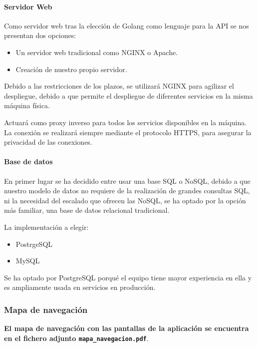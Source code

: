 \documentclass{article}
\begin{document}
\paragraph*{Servidor Web}

Como servidor web tras la elección de Golang como lenguaje para la API se nos presentan dos opciones:

\begin{itemize}
    \item Un servidor web tradicional como NGINX o Apache.
    \item Creación de nuestro propio servidor.
\end{itemize}

Debido a las restricciones de los plazos, se utilizará NGINX para agilizar el despliegue, debido a que permite el despliegue de diferentes servicios en la misma
máquina física.

Actuará como proxy inverso para todos los servicios disponibles en la máquina. La conexión se realizará siempre mediante el protocolo HTTPS, para asegurar la
privacidad de las conexiones.

\paragraph*{Base de datos}

En primer lugar se ha decidido entre usar una base SQL o NoSQL, debido a que nuestro modelo de datos no requiere de la realización de grandes consultas 
SQL, ni la necesidad del escalado que ofrecen las NoSQL, se ha optado por la opción más familiar, una base de datos relacional tradicional.

La implementación a elegir:

\begin{itemize}
    \item PostrgeSQL
    \item MySQL
\end{itemize}

Se ha optado por PostgreSQL porqué el equipo tiene mayor experiencia en ella y es ampliamente usada en servicios en producción.


\subsubsection{Mapa de navegación}
\textbf{El mapa de navegación  con las pantallas de la aplicación se encuentra en el fichero adjunto \texttt{mapa\_navegacion.pdf}}.

\end{document}
